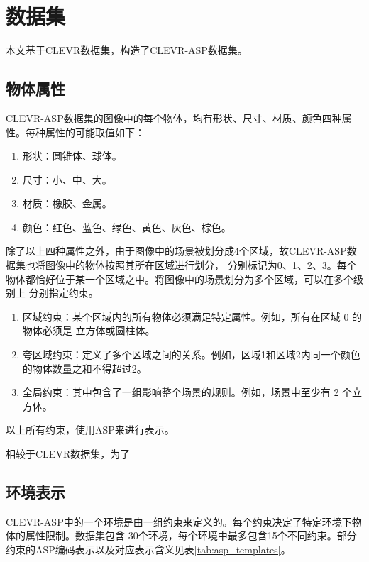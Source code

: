 \chapter{数据集}
本文基于CLEVR数据集，构造了CLEVR-ASP数据集。
\section{物体属性}
CLEVR-ASP数据集的图像中的每个物体，均有形状、尺寸、材质、颜色四种属性。每种属性的可能取值如下：
\begin{enumerate}[label=(\arabic*),itemsep=0pt,parsep=0pt]
    \item 形状：圆锥体、球体。
    \item 尺寸：小、中、大。
    \item 材质：橡胶、金属。
    \item 颜色：红色、蓝色、绿色、黄色、灰色、棕色。
\end{enumerate}

除了以上四种属性之外，由于图像中的场景被划分成4个区域，故CLEVR-ASP数据集也将图像中的物体按照其所在区域进行划分，
分别标记为0、1、2、3。每个物体都恰好位于某一个区域之中。将图像中的场景划分为多个区域，可以在多个级别上
分别指定约束。

\begin{enumerate}
    \item 区域约束：某个区域内的所有物体必须满足特定属性。例如，所有在区域 0 的物体必须是 立方体或圆柱体。
    \item 夸区域约束：定义了多个区域之间的关系。例如，区域1和区域2内同一个颜色的物体数量之和不得超过2。
    \item 全局约束：其中包含了一组影响整个场景的规则。例如，场景中至少有 2 个立方体。
\end{enumerate}

以上所有约束，使用ASP来进行表示。

相较于CLEVR数据集，为了
\section{环境表示}
CLEVR-ASP中的一个环境是由一组约束来定义的。每个约束决定了特定环境下物体的属性限制。数据集包含
30个环境，每个环境中最多包含15个不同约束。部分约束的ASP编码表示以及对应表示含义见表\ref{tab:asp_templates}。

